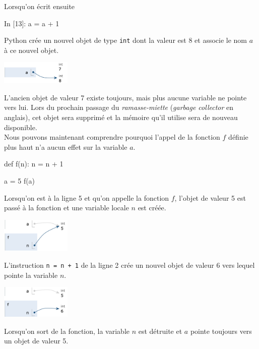 \documentclass{magnoliaold}
\begin{document}
\noindent Lorsqu'on écrit ensuite

\begin{pythoncode}
In [13]: a = a + 1   
\end{pythoncode}
\noindent
Python crée un nouvel objet de type \verb_int_ dont la valeur est 8 et associe le nom $a$ à ce nouvel objet.

\begin{center}
\includegraphics[width=0.25\textwidth]{../../commun/images/python-cours-tutor-2}
\end{center}
\noindent
L'ancien objet de valeur 7 existe toujours, mais plus aucune variable ne pointe vers lui. Lors du prochain passage
du \emph{ramasse-miette} (\emph{garbage collector} en anglais), cet objet sera supprimé et la mémoire qu'il utilise
sera de nouveau disponible.\\

Nous pouvons maintenant comprendre pourquoi l'appel de la fonction $f$ définie plus haut n'a aucun effet sur
la variable $a$.

\begin{pythoncode}
def f(n):
    n = n + 1

a = 5
f(a)
\end{pythoncode}
Lorsqu'on est à la ligne 5 et qu'on appelle la fonction $f$, l'objet de valeur 5 est passé à la fonction
et une variable locale $n$ est créée.

\begin{center}
\includegraphics[width=0.25\textwidth]{../../commun/images/python-cours-tutor-4}
\end{center}
\noindent
L'instruction \verb!n = n + 1! de la ligne 2 crée un nouvel objet de valeur 6 vers lequel pointe la
variable $n$.
\begin{center}
\includegraphics[width=0.25\textwidth]{../../commun/images/python-cours-tutor-5}
\end{center}
\noindent
Lorsqu'on sort de la fonction, la variable $n$ est détruite et $a$ pointe toujours vers un objet
de valeur 5.\\
\end{document}
